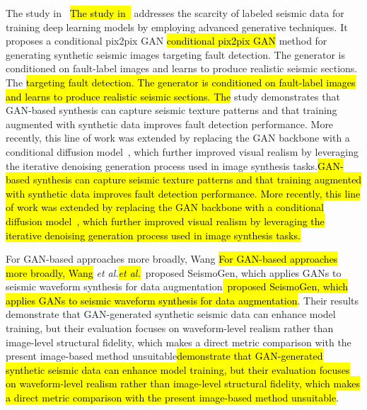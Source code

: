 \documentclass{ieeeaccess}
\makeatletter
\DeclareRobustCommand{\DIFaddbegin}{\DIFOaddbegin \let\includegraphics\DIFaddincludegraphics} %
\DeclareRobustCommand{\DIFaddend}{\DIFOaddend \let\includegraphics\DIFOincludegraphics} %
\DeclareRobustCommand{\DIFdelbegin}{\DIFOdelbegin \let\includegraphics\DIFdelincludegraphics} %
\DeclareRobustCommand{\DIFdelend}{\DIFOaddend \let\includegraphics\DIFOincludegraphics} %
\let\sout@orig\sout %
\renewcommand{\sout}[1]{\ifmmode\text{\sout@orig{\ensuremath{#1}}}\else\sout@orig{#1}\fi} %
\providecommand{\DIFadd}[1]{{\protect\color{blue}#1}}
\providecommand{\DIFdel}[1]{{\protect\color{red}\sout{#1}}}
\renewcommand{\DIFadd}[1]{\ifmmode#1\else\begingroup\let\protect\relax\hl{#1}\endgroup\fi}
\renewcommand{\DIFdel}[1]{}
\providecommand{\DIFaddbegin}{}
\providecommand{\DIFaddend}{}
\providecommand{\DIFdelbegin}{}
\providecommand{\DIFdelend}{}
\renewcommand{\DIFaddbegin}{}
\renewcommand{\DIFaddend}{}
\renewcommand{\DIFdelbegin}{}
\renewcommand{\DIFdelend}{}
\makeatother
\begin{document}
\DIFaddbegin \DIFadd{The study in~\cite{Choi2021} }\DIFaddend addresses the scarcity of labeled seismic data for training deep learning models by employing advanced generative techniques. It proposes a \DIFaddbegin \DIFadd{conditional pix2pix GAN }\DIFaddend method for generating synthetic seismic images \DIFdelbegin \DIFdel{using diffusion models, a class of generative models proficient in various image synthesis tasks. While their primary focus is on generating synthetic seismic data for fault detection, their conditional diffusion model incorporates geological context, ensuring the synthetic images are not only realistic , but also are geologically plausible. Their }\DIFdelend \DIFaddbegin \DIFadd{targeting fault detection. The generator is conditioned on fault-label images and learns to produce realistic seismic sections. The }\DIFaddend study demonstrates that \DIFdelbegin \DIFdel{diffusion models can effectively capture the complex patterns and textures in seismic imaging data , yielding high-quality synthetic images}\DIFdelend \DIFaddbegin \DIFadd{GAN-based synthesis can capture seismic texture patterns and that training augmented with synthetic data improves fault detection performance. More recently, this line of work was extended by replacing the GAN backbone with a conditional diffusion model~\cite{Choi2025}, which further improved visual realism by leveraging the iterative denoising generation process used in image synthesis tasks.}

\DIFadd{For GAN-based approaches more broadly, Wang }\emph{\DIFadd{et al.}}\DIFadd{~\cite{Wang2021}proposed SeismoGen, which applies GANs to seismic waveform synthesis for data augmentation}\DIFaddend . Their results \DIFdelbegin \DIFdel{confirm that synthetic seismic images enhance the trainingof fault detection algorithms, leading to an improved performance in identifying subsurface structures}\DIFdelend \DIFaddbegin \DIFadd{demonstrate that GAN-generated synthetic seismic data can enhance model training, but their evaluation focuses on waveform-level realism rather than image-level structural fidelity, which makes a direct metric comparison with the present image-based method unsuitable}\DIFaddend .
\end{document}
